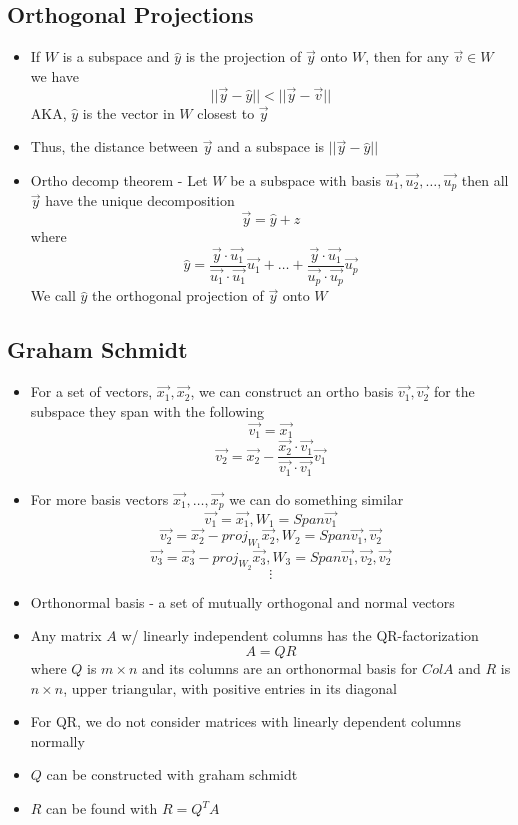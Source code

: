 \documentclass{article}
\begin{document}
\subsection{Orthogonal Projections}
\begin{itemize}
    \item If \(W\) is a subspace and \(\hat{y}\) is the projection of \(\vec{y}\) onto \(W\), then for any \(\vec{v}\in W\) we have 
    \[||\vec{y}-\hat{y}||<||\vec{y}-\vec{v}||\] 
    AKA, \(\hat{y}\) is the vector in \(W\) closest to \(\vec{y}\) 
    \item Thus, the distance between \(\vec{y}\) and a subspace is \(||\vec{y}-\hat{y}||\)
    \item Ortho decomp theorem - Let \(W\) be a subspace with basis \(\vec{u_1},\vec{u_2},\dots,\vec{u_p}\) then all \(\vec{y}\) have the unique decomposition
    \[\vec{y}=\hat{y}+z\] where \[\hat{y}=\frac{\vec{y}\cdot\vec{u_1}}{\vec{u_1}\cdot\vec{u_1}}\vec{u_1}+\dots +\frac{\vec{y}\cdot\vec{u_1}}{\vec{u_p}\cdot\vec{u_p}}\vec{u_p}\]
    We call \(\hat{y}\) the orthogonal projection of \(\vec{y}\) onto \(W\) 
\end{itemize}

\subsection{Graham Schmidt}
\begin{itemize}
    \item  For a set of vectors, \(\vec{x_1},\vec{x_2}\), we can construct an ortho basis \(\vec{v_1},\vec{v_2}\) for the subspace they span with the following 
    \[\vec{v_1}=\vec{x_1}\] \[\vec{v_2}=\vec{x_2}-\frac{\vec{x_2}\cdot\vec{v_1}}{\vec{v_1}\cdot\vec{v_1}}\vec{v_1}\]
    \item For more basis vectors \(\vec{x_1},\dots,\vec{x_p}\) we can do something similar 
    \[\vec{v_1}=\vec{x_1}, W_1=Span{\vec{v_1}}\]
    \[\vec{v_2}=\vec{x_2}-proj_{W_1}\vec{x_2}, W_2=Span{\vec{v_1},\vec{v_2}}\]
    \[\vec{v_3}=\vec{x_3}-proj_{W_2}\vec{x_3}, W_3=Span{\vec{v_1},\vec{v_2},\vec{v_2}}\]
    \[\vdots\]
    \item Orthonormal basis - a set of mutually orthogonal and normal vectors
    \item Any matrix \(A\) w/ linearly independent columns has the QR-factorization 
    \[A=QR\] where \(Q\) is \(m\times n\) and its columns are an orthonormal basis for \(Col A\) and \(R\) is \(n\times n\), upper triangular, with positive entries in its diagonal 
    \item For QR, we do not consider matrices with linearly dependent columns normally
    \item \(Q\) can be constructed with graham schmidt 
    \item \(R\) can be found with \(R=Q^TA\) 
\end{itemize}
\end{document}
